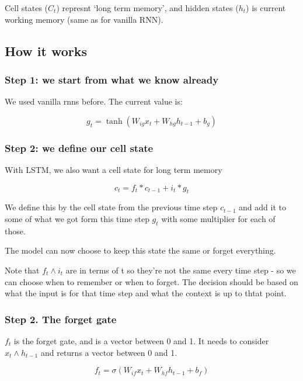 \documentclass[11pt]{article}
\begin{document}
Cell states ($C_t$) represnt `long term memory', and hidden states ($h_t$) is current working memory (same as for vanilla RNN).

\subsection{How it works}

\subsubsection{Step 1: we start from what we know already}

We used vanilla rnns before. The current value is:

\begin{equation*}
    g_t = \tanh(W_{ig}x_t + W_{hg}h_{t-1} + b_g)
\end{equation*}

\subsubsection{Step 2: we define our cell state}

With LSTM, we also want a cell state for long term memory

\begin{equation*}
    c_t = f_t \ast c_{t-1} + i_t \ast g_t
\end{equation*}

We define this by the cell state from the previous time step $c_{t-1}$ and add it to some of what we got form this time step $g_t$ with some multiplier for each of those.

The model can now choose to keep this state the same or forget everything. 

Note that $f_t \wedge i_t$  are in terms of t so they're not the same every time step - so we can choose when to remember or when to forget. The decision should be based on what the input is for that time step and what the context is up to thtat point.

\subsubsection{Step 2. The forget gate}

$f_t$ is the forget gate, and is a vector between 0 and 1. It needs to consider $x_t \wedge h_{t-1}$ and returns a vector between 0 and 1.

\begin{equation*}
    f_t = \sigma (W_{if}x_t + W_{hf}h_{t-1}+b_f)
\end{equation*}
\end{document}
